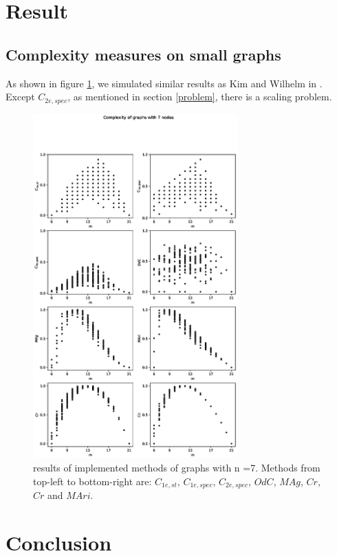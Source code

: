 \documentclass[12pt]{article}
\begin{document}
\section{Result}
\subsection{Complexity measures on small graphs}
As shown in figure \ref{fig:small_graphs}, we simulated similar results as Kim and Wilhelm in \cite{KIM20082637}. Except $C_{2e,spec}$, as mentioned in section \ref{problem}, there is a scaling problem.
\\
\clearpage
\begin{figure}[ht]
    \includegraphics[width=0.7\textwidth]{complexities.eps}
    \centering
    \caption{results of implemented methods of graphs with n =7. Methods from top-left to bottom-right are: $C_{1e,st}$, $C_{1e,spec}$, $C_{2e,spec}$, $OdC$, $MAg$, $Cr$, $Cr$ and $MAri$.}
    \label{fig:small_graphs}
\end{figure}

\section{Conclusion}

\printbibliography
\end{document}
